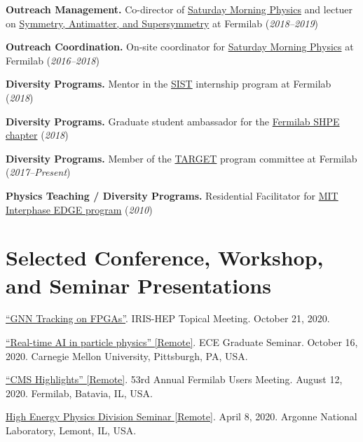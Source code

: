 \documentclass[11pt]{res}
\newcommand{\MarginText}[1]{\section{#1}\vspace{10pt}}
\begin{document}
\begin{resume}
\textbf{Outreach Management.} Co-director of \href{http://saturdaymorningphysics.fnal.gov/}{Saturday
  Morning Physics} and lectuer on \href{http://saturdaymorningphysics.fnal.gov/fall-session-2018/}{Symmetry, Antimatter, and Supersymmetry} at Fermilab (\textit{2018--2019})

\textbf{Outreach Coordination.} On-site coordinator for \href{http://saturdaymorningphysics.fnal.gov/}{Saturday Morning Physics} at Fermilab (\textit{2016--2018})

\textbf{Diversity Programs.} Mentor in the \href{http://diversity.fnal.gov/sist/}{SIST} internship program at Fermilab (\textit{2018})

\textbf{Diversity Programs.} Graduate student ambassador for the \href{http://diversity.fnal.gov/fshpe/}{Fermilab SHPE chapter} (\textit{2018})

\textbf{Diversity Programs.} Member of the \href{http://diversity.fnal.gov/target/}{TARGET} program committee at Fermilab (\textit{2017--Present})

\textbf{Physics Teaching / Diversity Programs.} Residential Facilitator for \href{http://ome.mit.edu/programs-services/program-overview}{MIT
  Interphase EDGE program} (\textit{2010})


\MarginText{Selected Conference, Workshop, and Seminar Presentations}


\href{https://indico.cern.ch/event/955026/}{``GNN Tracking on FPGAs''}. IRIS-HEP Topical Meeting. October 21, 2020.

\href{https://www.cs.cmu.edu/calendar/fri-2020-10-16-1200/ece-graduate-seminar}{``Real-time AI in particle physics'' [Remote]}. ECE Graduate Seminar. October 16, 2020. Carnegie Mellon University, Pittsburgh, PA, USA.

\href{https://indico.fnal.gov/event/23109/contributions/193292/}{``CMS Highlights'' [Remote]}. 53rd Annual Fermilab Users Meeting. August 12, 2020. Fermilab, Batavia, IL, USA.

\href{https://indico.fnal.gov/event/22961/}{High Energy Physics Division Seminar [Remote]}. April 8, 2020. Argonne National Laboratory, Lemont, IL, USA.



\end{resume}
\end{document}
